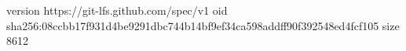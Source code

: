 version https://git-lfs.github.com/spec/v1
oid sha256:08ccbb17f931d4be9291dbc744b14bf9ef34ca598addff90f392548ed4fcf105
size 8612
